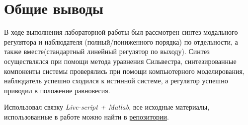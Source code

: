 \chapter{Общие выводы}
\label{ch:chap6}

В ходе выполнения лабораторной работы был рассмотрен синтез модального регулятора и наблюдателя (полный/пониженного порядка) по отдельности, а также вместе(стандартный линейный регулятор по выходу). 
Синтез осуществлялся при помощи метода уравнения Сильвестра, синтезированные компоненты системы проверялись при помощи компьютерного моделирования, наблюдатель успешно сходился к истинной системе, 
а регулятор успешно приводил в положение равновесия.

Использовал связку \textit{Live-script + Matlab}, все исходные материалы, использованные в работе можно найти  в \href{https://github.com/GreedlyCore/control_theory_course}{репозитории}. 
\endinput